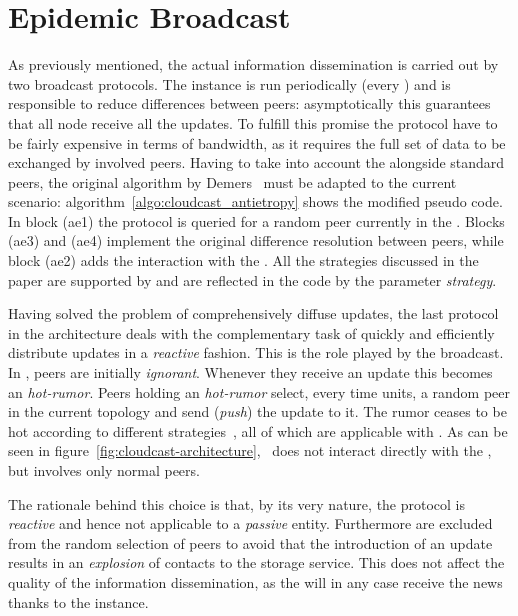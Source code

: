 \section{Epidemic Broadcast}
\label{sec:epidemicbroadcast}
As previously mentioned, the actual information dissemination is
carried out by two \epidemic broadcast protocols. The
\antientropy instance is run periodically (every \deltaAntiEntropy)
and is responsible to
reduce differences between peers: asymptotically this guarantees that
all node receive all the updates. To fulfill this promise the
protocol have to be fairly expensive in terms of bandwidth, as it
requires the full set of data to be exchanged by involved
peers. Having to take into account the \cloud alongside standard peers,
the original algorithm by Demers~\cite{EpidemicAlgorithms} must be
adapted to the current scenario:
algorithm~\ref{algo:cloudcast_antietropy} shows the modified pseudo
code.
In block (ae1) the \cloudcast \peersampling protocol is queried
for a random peer currently in the \view. Blocks (ae3) and (ae4)
implement the original difference resolution between peers, while
block (ae2) adds the interaction with the \cloud.
All the strategies discussed in the paper are supported by
\cloudcast and are reflected in the code by the parameter
\emph{strategy}.



Having solved the problem of comprehensively diffuse updates, the last
protocol in the architecture deals with the complementary task of
quickly and efficiently distribute updates in a \emph{reactive} fashion. This is the
role played by the \rumormongering \epidemic broadcast.
In \rumormongering, peers are initially \emph{ignorant}. Whenever they
receive an update this becomes an \emph{hot-rumor}. Peers holding an
\emph{hot-rumor}
select, every \deltaRumorMongering time units, a random peer in the current
topology and send (\emph{push}) the update to it. The rumor ceases to
be hot according to different strategies~\cite{EpidemicAlgorithms},
 all of which are applicable with \cloudcast.
As can be seen in figure~\ref{fig:cloudcast-architecture}, \rumormongering\
does not interact directly with the \cloud, but involves only normal
peers.

The rationale behind this choice is that, by its very nature, the
protocol is \emph{reactive} and hence not applicable to a
\emph{passive} entity. Furthermore \cloud \descriptors are
excluded from the random selection of peers to avoid that the
introduction of an update results in an \emph{explosion} of contacts
to the storage service. This does not affect the quality of the
information dissemination, as the \cloud will in any case receive the
news thanks to the \antientropy instance.

